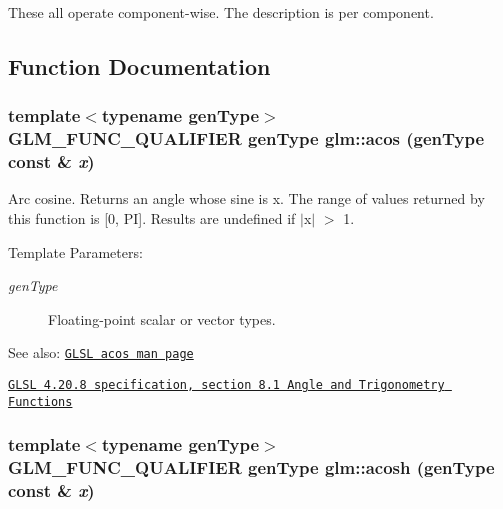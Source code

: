 These all operate component-wise. The description is per component. 

\subsection{Function Documentation}
\hypertarget{group__core__func__trigonometric_gd945cb7263cb202d93ea76aa5d419078}{
\subsubsection[acos]{\setlength{\rightskip}{0pt plus 5cm}template$<$typename genType$>$ GLM\_\-FUNC\_\-QUALIFIER genType glm::acos (genType const \& {\em x})}}
\label{group__core__func__trigonometric_gd945cb7263cb202d93ea76aa5d419078}


Arc cosine. Returns an angle whose sine is x. The range of values returned by this function is \mbox{[}0, PI\mbox{]}. Results are undefined if $|$x$|$ $>$ 1.

\begin{Desc}
\item[Template Parameters:]
\begin{description}
\item[{\em genType}]Floating-point scalar or vector types.\end{description}
\end{Desc}
\begin{Desc}
\item[See also:]\href{http://www.opengl.org/sdk/docs/manglsl/xhtml/acos.xml}{\tt GLSL acos man page} 

\href{http://www.opengl.org/registry/doc/GLSLangSpec.4.20.8.pdf}{\tt GLSL 4.20.8 specification, section 8.1 Angle and Trigonometry Functions} \end{Desc}
\hypertarget{group__core__func__trigonometric_g7d91deddd26925a390f08448a1b9ab1a}{
\subsubsection[acosh]{\setlength{\rightskip}{0pt plus 5cm}template$<$typename genType$>$ GLM\_\-FUNC\_\-QUALIFIER genType glm::acosh (genType const \& {\em x})}}
\label{group__core__func__trigonometric_g7d91deddd26925a390f08448a1b9ab1a}


